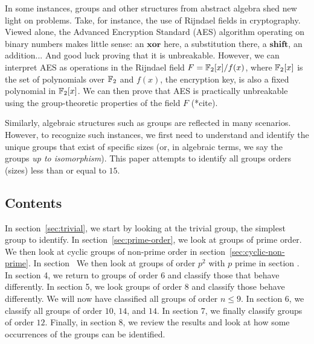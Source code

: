 In some instances, groups and other structures from abstract algebra
shed new light on problems.
Take, for instance, the use of Rijndael fields in cryptography.
Viewed alone, the Advanced Encryption Standard (AES) algorithm
operating on binary numbers makes little sense:
an $\mathbf{xor}$ here, a substitution there, a $\mathbf{shift}$,
an addition... And good luck proving that it is unbreakable.
However, we can interpret AES as operations in the Rijndael field
$F = \mathbb{F}_2[x]/f(x)$, where $\mathbb{F}_2[x]$ is the set of polynomials over $\mathbb{F}_2$
and $f(x)$, the encryption key, is also a fixed polynomial in $\mathbb{F}_2[x]$.
We can then prove that AES is practically unbreakable 
using the group-theoretic properties of the field $F$ (*cite).

Similarly, algebraic structures such as groups are reflected in many scenarios.
However, to recognize such instances, we first need to understand
and identify the unique groups that exist of specific sizes
(or, in algebraic terms, we say the groups \emph{up to isomorphism}).
This paper attempts to identify all groups orders (sizes) less than or equal to $15$.

\subsection*{Contents}
In section~\ref{sec:trivial}, we start by looking at the trivial group, the simplest group to identify.
In section~\ref{sec:prime-order}, we look at groups of prime order.
We then look at cyclic groups of non-prime order in section~\ref{sec:cyclic-non-prime}.
In section~
We then look at groups of order $p^2$ with $p$ prime in section .
In section 4, we return to groups of order $6$ and classify those that behave differently.
In section 5, we look groups of order $8$ and classify those behave differently.
We will now have classified all groups of order $n \le 9$.
In section 6, we classify all groups of order $10$, $14$, and $14$.
In section 7, we finally classify groups of order $12$.
Finally, in section 8, we review the results and look at how
some occurrences of the groups can be identified.
